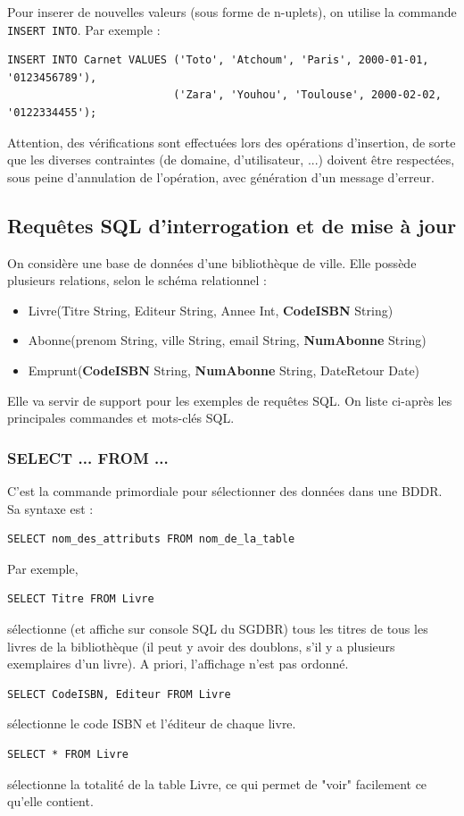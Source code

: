 \documentclass[french,11pt,twoside]{VcCours}
\begin{document}
Pour inserer de nouvelles valeurs (sous forme de n-uplets), on utilise la commande \verb'INSERT INTO'. Par exemple :
\begin{verbatim}
INSERT INTO Carnet VALUES ('Toto', 'Atchoum', 'Paris', 2000-01-01, '0123456789'),
                          ('Zara', 'Youhou', 'Toulouse', 2000-02-02, '0122334455');
\end{verbatim}

Attention, des vérifications sont effectuées lors des opérations d'insertion, de sorte que les diverses contraintes (de domaine, d'utilisateur, ...) doivent être respectées, sous peine d'annulation de l'opération, avec génération d'un message d'erreur.


\subsection{Requêtes SQL d'interrogation et de mise à jour}


On considère une base de données d'une bibliothèque de ville. Elle possède plusieurs relations, selon le schéma relationnel :
\begin{itemize}
 \item Livre(Titre String, Editeur String, Annee Int, \textbf{CodeISBN} String) 
 \item Abonne(prenom String, ville String, email String, \textbf{NumAbonne} String)
 \item Emprunt(\textbf{CodeISBN} String, \textbf{NumAbonne} String, DateRetour Date)
\end{itemize}
Elle va servir de support pour les exemples de requêtes SQL. On liste ci-après les principales commandes et mots-clés SQL.


\subsubsection*{SELECT ... FROM ...}

C'est la commande primordiale pour sélectionner des données dans une BDDR. Sa syntaxe est :
\begin{verbatim}
SELECT nom_des_attributs FROM nom_de_la_table
\end{verbatim}
Par exemple,
\begin{verbatim}
SELECT Titre FROM Livre
\end{verbatim}
sélectionne (et affiche sur console SQL du SGDBR) tous les titres de tous les livres de la bibliothèque (il peut y avoir des doublons, s'il y a plusieurs exemplaires d'un livre). A priori, l'affichage n'est pas ordonné.
\begin{verbatim}
SELECT CodeISBN, Editeur FROM Livre
\end{verbatim}
sélectionne le code ISBN et l'éditeur de chaque livre.
\begin{verbatim}
SELECT * FROM Livre
\end{verbatim}
sélectionne la totalité de la table Livre, ce qui permet de "voir" facilement ce qu'elle contient.
\end{document}
